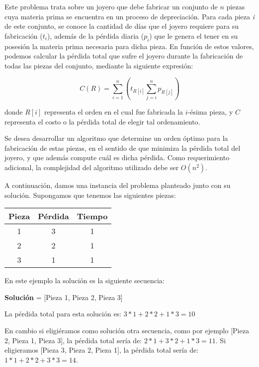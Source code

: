 Este problema trata sobre un joyero que debe fabricar un conjunto de $n$ piezas cuya materia prima se encuentra en un proceso de depreciación. Para cada pieza \emph{i} de este conjunto, se conoce la cantidad de días que el joyero requiere para su fabricación (\emph{$t_i$}), además de la pérdida diaria (\emph{$p_i$}) que le genera el tener en su posesión la materia prima necesaria para dicha pieza. En función de estos valores, podemos calcular la pérdida total que sufre el joyero durante la fabricación de todas las piezas del conjunto, mediante la siguiente expresión:

$$C(R) = \sum_{i=1}^{n} (t_{R[i]} \sum_{j=i}^{n}p_{R[j]})$$

donde $R[i]$ representa el orden en el cual fue fabricada la $i$-ésima pieza, y $C$ representa el costo o la pérdida total de elegir tal ordenamiento.

Se desea desarrollar un algoritmo que determine un orden óptimo para la fabricación de estas piezas, en el sentido de que minimiza la pérdida total del joyero, y que además compute cuál es dicha pérdida. Como requerimiento adicional, la complejidad del algoritmo utilizado debe ser $O(n^2)$.

A continuación, damos una instancia del problema planteado junto con su solución. Supongamos que tenemos las siguientes piezas:

\begin{center}
  \begin{tabular}{|c|c|c|}
   \hline
   \textbf{Pieza} & \textbf{Pérdida} & \textbf{Tiempo} \\
   \hline
   1 & 3 & 1 \\
   
   2 & 2 & 1 \\
   
   3 & 1 & 1 \\
   \hline
  \end{tabular}
\end{center}

En este ejemplo la solución es la siguiente secuencia:

\textbf{Solución} = [Pieza 1, Pieza 2, Pieza 3]

La pérdida total para esta solución es: $3*1 + 2*2 + 1*3 = 10$

En cambio si eligiéramos como solución otra secuencia, como por ejemplo [Pieza 2, Pieza 1, Pieza 3], la pérdida total sería de: $2*1 + 3*2 + 1*3 = 11$. Si eligieramos [Pieza 3, Pieza 2, Pieza 1], la pérdida total sería de: $1*1 + 2*2 + 3*3 = 14$.